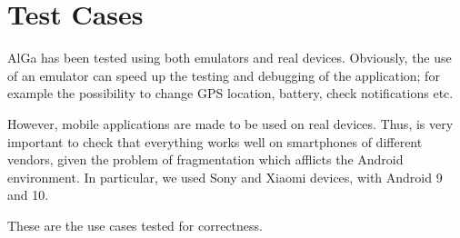 \chapter{Test Cases}
\label{chap:testCases}
AlGa has been tested using both emulators and real devices. Obviously, the use of an emulator can speed up the testing and debugging of the application; for example the possibility to change GPS location, battery, check notifications etc.

However, mobile applications are made to be used on real devices. Thus, is very important to check that everything works well on smartphones of different vendors, given the problem of fragmentation which afflicts the Android environment.
In particular, we used Sony and Xiaomi devices, with Android 9 and 10.

These are the use cases tested for correctness.

